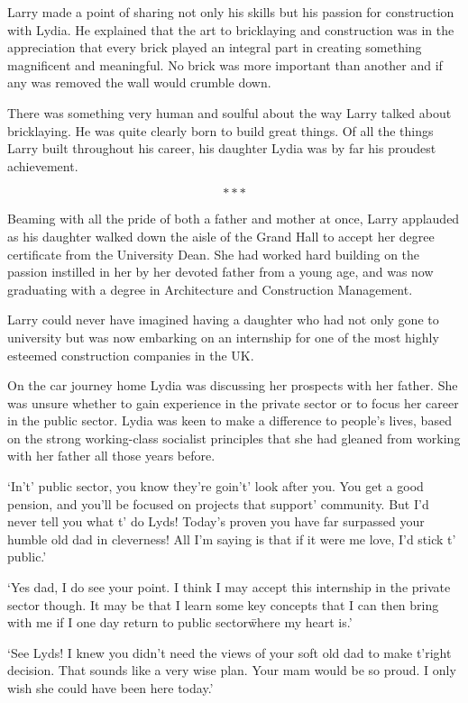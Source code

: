 Larry made a point of sharing not only his skills but his passion for
construction with Lydia. He explained that the art to bricklaying and
construction was in the appreciation that every brick played an
integral part in creating something magnificent and meaningful. No
brick was more important than another and if any was removed the wall
would crumble down.

There was something very human and soulful about the way Larry talked
about bricklaying. He was quite clearly born to build great things. Of
all the things Larry built throughout his career, his daughter Lydia
was by far his proudest achievement.

\[***\]

Beaming with all the pride of both a father and mother at once, Larry
applauded as his daughter walked down the aisle of the Grand Hall to
accept her degree certificate from the University Dean. She had worked
hard building on the passion instilled in her by her devoted father
from a young age, and was now graduating with a degree in Architecture
and Construction Management.

Larry could never have imagined having a daughter who had not only
gone to university but was now embarking on an internship for one of
the most highly esteemed construction companies in the UK.

On the car journey home Lydia was discussing her prospects with her
father. She was unsure whether to gain experience in the private
sector or to focus her career in the public sector. Lydia was keen to
make a difference to people's lives, based on the strong working-class
socialist principles that she had gleaned from working with her father
all those years before.

`In't' public sector, you know they're goin't' look after you. You get
a good pension, and you'll be focused on projects that support'
community. But I'd never tell you what t' do Lyds! Today's proven you
have far surpassed your humble old dad in cleverness! All I'm saying
is that if it were me love, I'd stick t' public.'

`Yes dad, I do see your point. I think I may accept this internship in
the private sector though. It may be that I learn some key concepts
that I can then bring with me if I one day return to public
sector\=where my heart is.'

`See Lyds! I knew you didn't need the views of your soft old dad to
make t'right decision. That sounds like a very wise plan. Your mam
would be so proud. I only wish she could have been here today.'

